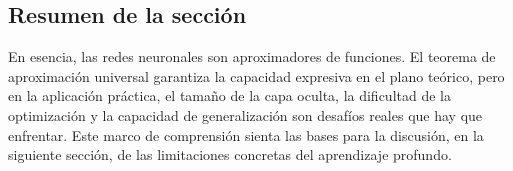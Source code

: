 \subsection{Resumen de la sección}

En esencia, las redes neuronales son aproximadores de funciones. El teorema de aproximación universal garantiza la capacidad expresiva en el plano teórico, pero en la aplicación práctica, el tamaño de la capa oculta, la dificultad de la optimización y la capacidad de generalización son desafíos reales que hay que enfrentar. Este marco de comprensión sienta las bases para la discusión, en la siguiente sección, de las limitaciones concretas del aprendizaje profundo.


